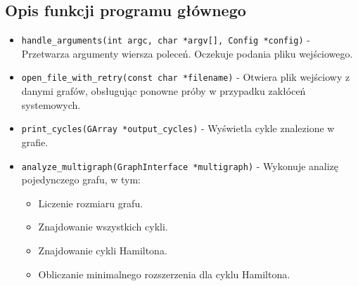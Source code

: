 \subsection{Opis funkcji programu głównego}

\begin{itemize}
    \item \texttt{handle\_arguments(int argc, char *argv[], Config *config)} - Przetwarza argumenty wiersza poleceń. Oczekuje podania pliku wejściowego.
    \item \texttt{open\_file\_with\_retry(const char *filename)} - Otwiera plik wejściowy z danymi grafów, obsługując ponowne próby w przypadku zakłóceń systemowych.
    \item \texttt{print\_cycles(GArray *output\_cycles)} - Wyświetla cykle znalezione w grafie.
    \item \texttt{analyze\_multigraph(GraphInterface *multigraph)} - Wykonuje analizę pojedynczego grafu, w tym:
    \begin{itemize}
        \item Liczenie rozmiaru grafu.
        \item Znajdowanie wszystkich cykli.
        \item Znajdowanie cykli Hamiltona.
        \item Obliczanie minimalnego rozszerzenia dla cyklu Hamiltona.
    \end{itemize}
\end{itemize}
